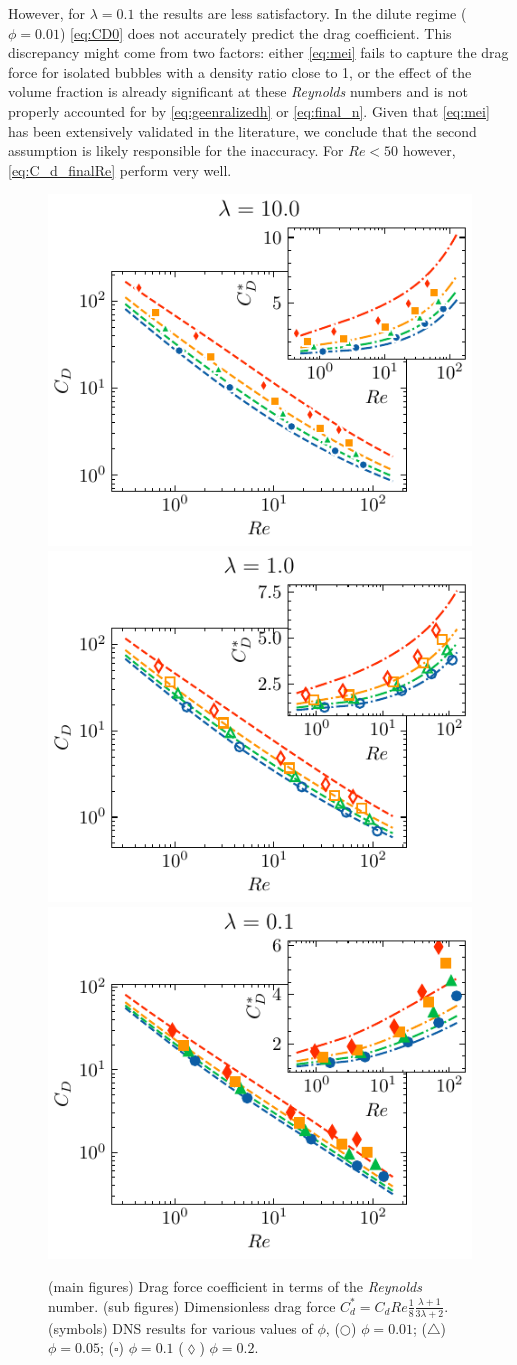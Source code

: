 However, for $\lambda = 0.1$ the results are less satisfactory. 
In the dilute regime ($\phi = 0.01$) \ref{eq:CD0} does not accurately predict the drag coefficient. 
This discrepancy might come from two factors: either \ref{eq:mei} fails to capture the drag force for isolated bubbles with a density ratio close to 1, or the effect of the volume fraction is already significant at these \textit{Reynolds} numbers and is not properly accounted for by \ref{eq:geenralizedh} or \ref{eq:final_n}. 
Given that \ref{eq:mei} has been extensively validated in the literature, we conclude that the second assumption is likely responsible for the inaccuracy. 
For $Re < 50$ however,  \ref{eq:C_d_finalRe} perform very well. 
\begin{figure}[h!]
    \centering
    \includegraphics[height = 0.3\textwidth]{image/HOMOGENEOUS_final/CA/Cp_l_10.pdf}
    \includegraphics[height = 0.3\textwidth]{image/HOMOGENEOUS_final/CA/Cp_l_1.pdf}
    \includegraphics[height = 0.3\textwidth]{image/HOMOGENEOUS_final/CA/Cp_l_0.pdf}
    \caption{
        (main figures)
        Drag force coefficient in terms of the \textit{Reynolds} number. 
        (sub figures) Dimensionless drag force $C_d^* =C_d Re \frac{1}{8}\frac{\lambda+1}{3\lambda +2}$. 
        (symbols) DNS results for various values of $\phi$, 
        ($\pmb\bigcirc$) $\phi = 0.01$; ($\pmb\triangle$) $ \phi = 0.05$; ($\pmb\square$) $\phi = 0.1$ ($\pmb\lozenge$) $\phi = 0.2$.
        }
    \label{fig:cp}
\end{figure}

